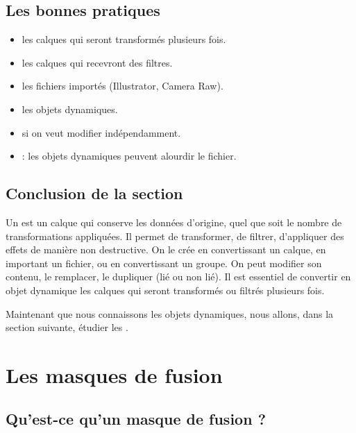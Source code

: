 \subsection{Les bonnes pratiques}

\begin{itemize}
    \item {} les calques qui seront transformés plusieurs fois.
    \item {} les calques qui recevront des filtres.
    \item {} les fichiers importés (Illustrator, Camera Raw).
    \item {} les objets dynamiques.
    \item {} si on veut modifier indépendamment.
    \item {} : les objets dynamiques peuvent alourdir le fichier.
\end{itemize}

\subsection*{Conclusion de la section}

Un  est un calque qui conserve les données d'origine, quel que soit le nombre de transformations appliquées. Il permet de transformer, de filtrer, d'appliquer des effets de manière non destructive. On le crée en convertissant un calque, en important un fichier, ou en convertissant un groupe. On peut modifier son contenu, le remplacer, le dupliquer (lié ou non lié). Il est essentiel de convertir en objet dynamique les calques qui seront transformés ou filtrés plusieurs fois.

Maintenant que nous connaissons les objets dynamiques, nous allons, dans la section suivante, étudier les .

\section{Les masques de fusion}

\subsection{Qu'est-ce qu'un masque de fusion ?}

